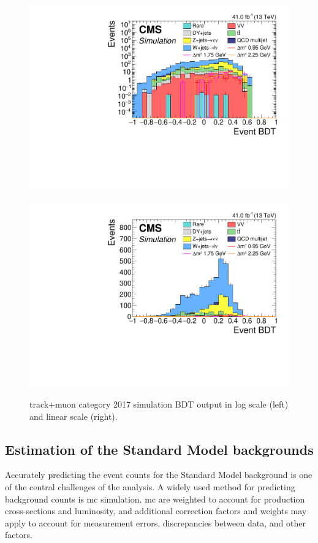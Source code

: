 \begin{figure}[!htb]
\centering
\includegraphics[width=0.48\linewidth]{plots/track_muon_bg_signal/none_exTrack_dilepBDTCorrJetNoMultIso10Dr0.6_log.pdf} \,
\includegraphics[width=0.48\linewidth]{plots/track_muon_bg_signal/none_exTrack_dilepBDTCorrJetNoMultIso10Dr0.6.pdf} \\

\caption[Exclusive track plus muon 2017 simulation BDT output]{track+muon category 2017 simulation BDT output in log scale (left) and linear scale (right).}
\label{fig:exclusive-track-bdt-sim-output}
\end{figure}

\clearpage
\subsection{Estimation of the Standard Model backgrounds}
\label{sec:background-estimation}

Accurately predicting the event counts for the Standard Model background is one of the central challenges of the analysis. A widely used method for predicting background counts is \gls{mc} simulation. \gls{mc} are weighted to account for production cross-sections and luminosity, and additional correction factors and weights may apply to account for measurement errors, discrepancies between data, and other factors.

